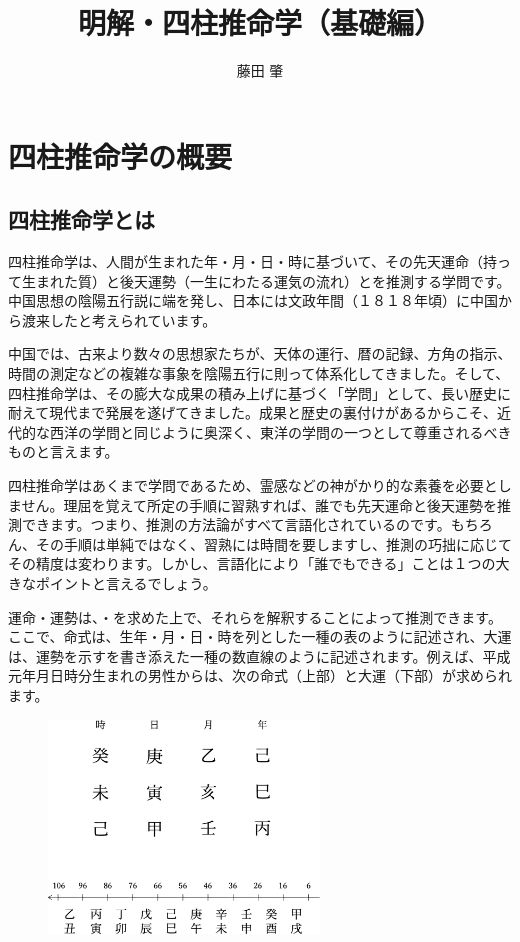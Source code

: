 \documentclass[a5paper,11pt,dvipdfmx]{tarticle}
\title{明解・四柱推命学（基礎編）}
\author{藤田 肇}
\begin{document}
\maketitle
\newpage
\tableofcontents
\newpage

\section{四柱推命学の概要}
\subsection{四柱推命学とは}

四柱推命学は、人間が生まれた年・月・日・時に基づいて、その先天運命（持って生まれた質）と後天運勢（一生にわたる運気の流れ）とを推測する学問です。中国思想の陰陽五行説に端を発し、日本には文政年間（１８１８年頃）に中国から渡来したと考えられています。

中国では、古来より数々の思想家たちが、天体の運行、暦の記録、方角の指示、時間の測定などの複雑な事象を陰陽五行に則って体系化してきました。そして、四柱推命学は、その膨大な成果の積み上げに基づく「学問」として、長い歴史に耐えて現代まで発展を遂げてきました。成果と歴史の裏付けがあるからこそ、近代的な西洋の学問と同じように奥深く、東洋の学問の一つとして尊重されるべきものと言えます。

四柱推命学はあくまで学問であるため、霊感などの神がかり的な素養を必要としません。理屈を覚えて所定の手順に習熟すれば、誰でも先天運命と後天運勢を推測できます。つまり、推測の方法論がすべて言語化されているのです。もちろん、その手順は単純ではなく、習熟には時間を要しますし、推測の巧拙に応じてその精度は変わります。しかし、言語化により「誰でもできる」ことは１つの大きなポイントと言えるでしょう。

運命・運勢は、・を求めた上で、それらを解釈することによって推測できます。ここで、命式は、生年・月・日・時を列とした一種の表のように記述され、大運は、運勢を示すを書き添えた一種の数直線のように記述されます。例えば、平成元年月日時分生まれの男性からは、次の命式（上部）と大運（下部）が求められます。

\begin{figure}
  \includegraphics[width=72mm,angle=90]{figs/figure1-1.eps}
\end{figure}
\end{document}
